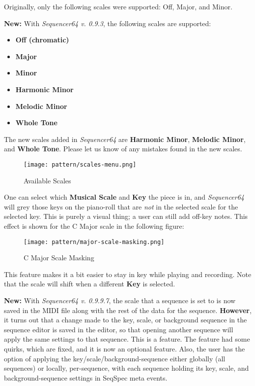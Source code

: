    Originally, only the following scales were supported: Off, Major, and Minor.

   \textbf{New:}
   With \textsl{Sequencer64 v. 0.9.3}, the following scales are supported:

   \begin{itemize}
      \item \textbf{Off (chromatic)}
      \item \textbf{Major}
      \item \textbf{Minor}
      \item \textbf{Harmonic Minor}
      \item \textbf{Melodic Minor}
      \item \textbf{Whole Tone}
   \end{itemize}

   The new scales added in \textsl{Sequencer64} are
   \textbf{Harmonic Minor}, \textbf{Melodic Minor}, and \textbf{Whole Tone}.
   Please let us know of any mistakes found in the new scales.

\begin{figure}[H]
   \centering 
   \texttt{[image: pattern/scales-menu.png]}
   \caption{Available Scales}
   \label{fig:pattern_editor_available_scales}
\end{figure}

   One can select which \textbf{Musical Scale} and
   \textbf{Key} the piece is in,
   and \textsl{Sequencer64} will grey those keys on the piano-roll that
   are \textsl{not} in the selected scale for the selected key.
   This is purely a visual thing; a user can still add off-key notes.
   This effect is shown for the C Major scale in the following figure:

\begin{figure}[H]
   \centering 
   \texttt{[image: pattern/major-scale-masking.png]}
   \caption{C Major Scale Masking}
   \label{fig:pattern_editor_major_scale_masking}
\end{figure}

   This feature makes it a bit easier to stay in key while playing and
   recording.  Note that the scale will shift when a different
   \textbf{Key} is selected.

   \textbf{New:}
   With \textsl{Sequencer64 v. 0.9.9.7}, the scale that a sequence is set to is
   now saved in the MIDI file along with the rest of the data for the sequence.
   \textbf{However},
   it turns out that a change made to the key, scale, or background sequence in
   the sequence editor is saved in the editor, so that opening another sequence
   will apply the same settings to that sequence.  This is a feature.
   The feature had some quirks, which are fixed, and it is now
   an optional feature.
   Also, the user has the option of applying the key/scale/background-sequence
   either globally (all sequences) or locally, per-sequence, with each sequence
   holding its key, scale, and background-sequence settings in
   SeqSpec meta events.

